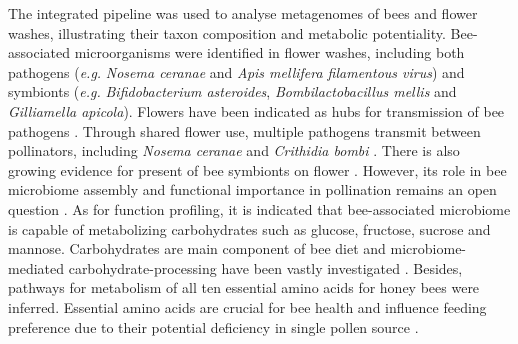 \documentclass[11pt]{article}
\begin{document}
\newline
The integrated pipeline was used to analyse metagenomes of bees and flower washes, illustrating their taxon composition and metabolic potentiality. 
Bee-associated microorganisms were identified in flower washes, including both pathogens (\textit{e.g.} \textit{Nosema ceranae} and \textit{Apis mellifera filamentous virus}) and symbionts (\textit{e.g.} \textit{Bifidobacterium asteroides}, \textit{Bombilactobacillus mellis} and \textit{Gilliamella apicola}). 
Flowers have been indicated as hubs for transmission of bee pathogens \cite{durrer1994shared,koch2017role,graystock2020dominant}. 
Through shared flower use, multiple pathogens transmit between pollinators, including \textit{Nosema ceranae} \citep{graystock2015parasites} 
and \textit{Crithidia bombi} \citep{figueroa2019bee}. 
There is also growing evidence for present of bee symbionts on flower \citep{mcfrederick2012environment,mcfrederick2017flowers,keller2020more,vannette2020floral}.
However, its role in bee microbiome assembly and functional importance in pollination remains an open question \citep{keller2020more,vannette2020floral}. 
As for function profiling, it is indicated that bee-associated microbiome is capable of metabolizing carbohydrates such as glucose, fructose, sucrose and mannose. 
Carbohydrates are main component of bee diet and microbiome-mediated carbohydrate-processing have been vastly investigated \citep{engel2012functional,lee2015saccharide,lee2018differential,taylor2019effect}. 
Besides, pathways for metabolism of all ten essential amino acids for honey bees \citep{groot1953protein} were inferred. 
Essential amino acids are crucial for bee health \citep{simcock2014single,paoli2014dietary,stabler2015nutrient,hendriksma2019effects} and influence feeding preference due to their potential deficiency in single pollen source \citep{cook2003honey,hendriksma2014amino,hendriksma2016honey}. 
\end{document}
